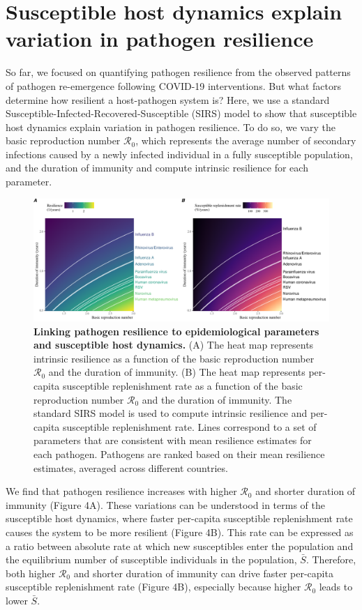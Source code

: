 \documentclass[12pt]{article}
\begin{document}
\section*{Susceptible host dynamics explain variation in pathogen resilience}

So far, we focused on quantifying pathogen resilience from the observed patterns of pathogen re-emergence following COVID-19 interventions.
But what factors determine how resilient a host-pathogen system is?
Here, we use a standard Susceptible-Infected-Recovered-Susceptible (SIRS) model to show that susceptible host dynamics explain variation in pathogen resilience.
To do so, we vary the basic reproduction number $\mathcal R_0$, which represents the average number of secondary infections caused by a newly infected individual in a fully susceptible population, and the duration of immunity and compute intrinsic resilience for each parameter.

\begin{figure}[!th]
\begin{center}
\includegraphics[width=\textwidth]{../figure_summary/figure_summary.pdf}
\caption{
\textbf{Linking pathogen resilience to epidemiological parameters and susceptible host dynamics.}
(A) The heat map represents intrinsic resilience as a function of the basic reproduction number $\mathcal R_0$ and the duration of immunity.
(B) The heat map represents per-capita susceptible replenishment rate as a function of the basic reproduction number $\mathcal R_0$ and the duration of immunity.
The standard SIRS model is used to compute intrinsic resilience and per-capita susceptible replenishment rate.
Lines correspond to a set of parameters that are consistent with mean resilience estimates for each pathogen.
Pathogens are ranked based on their mean resilience estimates, averaged across different countries.
}
\end{center}
\end{figure}

We find that pathogen resilience increases with higher $\mathcal R_0$ and shorter duration of immunity (Figure 4A).
These variations can be understood in terms of the susceptible host dynamics, where faster per-capita susceptible replenishment rate causes the system to be more resilient (Figure 4B).
This rate can be expressed as a ratio between absolute rate at which new susceptibles enter the population and the equilibrium number of susceptible individuals in the population, $\bar{S}$.
Therefore, both higher $\mathcal R_0$ and shorter duration of immunity can drive faster per-capita susceptible replenishment rate  (Figure 4B), especially because higher $\mathcal R_0$ leads to lower $\bar{S}$.
\end{document}

